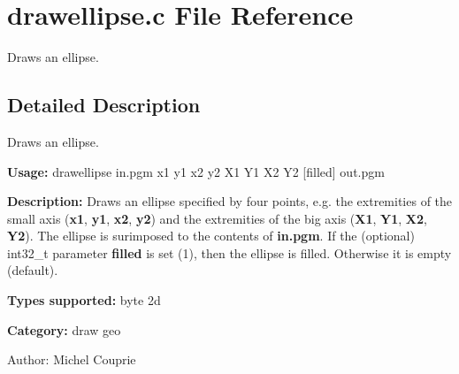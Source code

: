 \section{drawellipse.c File Reference}
\label{drawellipse_8c}
Draws an ellipse. 



\subsection{Detailed Description}
Draws an ellipse. 

{\bf Usage:} drawellipse in.pgm x1 y1 x2 y2 X1 Y1 X2 Y2 [filled] out.pgm

{\bf Description:} Draws an ellipse specified by four points, e.g. the extremities of the small axis ({\bf x1}, {\bf y1}, {\bf x2}, {\bf y2}) and the extremities of the big axis ({\bf X1}, {\bf Y1}, {\bf X2}, {\bf Y2}). The ellipse is surimposed to the contents of {\bf in.pgm}. If the (optional) int32\_\-t parameter {\bf filled} is set (1), then the ellipse is filled. Otherwise it is empty (default).

{\bf Types supported:} byte 2d

{\bf Category:} draw geo

\begin{Desc}
\item[Author:]Michel Couprie \end{Desc}
